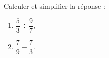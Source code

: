 
\begin{exercice}\label{exo2smath-0092}

    Calculer et simplifier la réponse :
    \begin{multicols}{2}
        \begin{enumerate}
            \item
                \( \dfrac{ 5 }{ 3 }\div\dfrac{ 9 }{ 7 }\),
            \item
                \( \dfrac{ 7 }{ 9 }-\dfrac{ 7 }{ 3 }\).
        \end{enumerate}
    \end{multicols}

\end{exercice}
